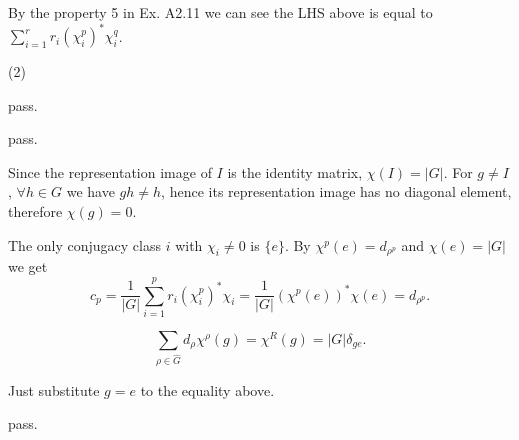 By the property 5 in Ex. A2.11 we can see the LHS above is equal to $\sum_{i=1}^r r_i(\chi_i^p)^*\chi_i^q$.

(2) \todo

\ex pass.

\ex pass.

\ex Since the representation image of $I$ is the identity matrix, $\chi(I)=|G|$.
For $g\neq I$, $\forall h\in G$ we have $gh\neq h$, hence its representation image has no diagonal element, therefore $\chi(g)=0$.

\ex The only conjugacy class $i$ with $\chi_i\neq 0$ is $\{e\}$.
By $\chi^p(e)=d_{\rho^p}$ and $\chi(e)=|G|$ we get
$$c_p=\frac{1}{|G|}\sum_{i=1}^pr_i(\chi^p_i)^*\chi_i=\frac{1}{|G|}(\chi^p(e))^*\chi(e)=d_{\rho^p}.$$

\ex $$\sum_{\rho\in\hat{G}}d_\rho\chi^\rho(g)=\chi^R(g)=|G|\delta_{ge}.$$

\ex Just substitute $g=e$ to the equality above.

\ex \todo


\ex pass.

\ex 